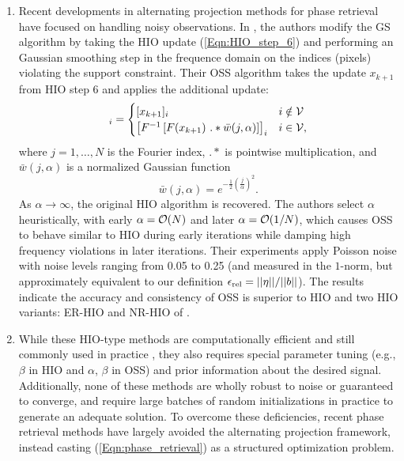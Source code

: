 \begin{enumerate}
\item

Recent developments in alternating projection methods for phase retrieval have focused on handling noisy observations.  In \cite{rodriguez2013oversampling}, the authors modify the GS algorithm by taking the HIO update (\ref{Eqn:HIO_step_6}) and performing an Gaussian smoothing step in the frequence domain on the indices (pixels) violating the support constraint.  Their OSS algorithm takes the update $x_{k+1}$ from HIO step 6 and applies the additional update:
\begin{equation}
[x'_{k+1}]_i =
	\begin{cases}
		[x_{k+1}]_i		&	i \notin \caV		\\
		\left[ F^{ -1} \left[ F ( x_{k+1}) \ .* \bar{w}(j, \alpha) \right]  \right]_i	&	 i \in \caV,
	\end{cases}
\end{equation}
where $j = 1, \ldots, N$ is the Fourier index, $.*$ is pointwise multiplication, and $\bar{w}(j, \alpha)$ is a normalized Gaussian function
\[
\bar{w}(j, \alpha) = e^ {- \frac{1}{2} \left(\frac{j}{\alpha} \right)^2}.
\]
As $\alpha \rightarrow \infty$, the original HIO algorithm is recovered.  The authors select $\alpha$ heuristically, with early $\alpha = {\mathcal O}(N)$ and later $\alpha = {\mathcal O}(1/N)$, which causes OSS to behave similar to HIO during early iterations while damping high frequency violations in later iterations.  Their experiments \cite[Section 3]{rodriguez2013oversampling} apply Poisson noise with noise levels ranging from 0.05 to 0.25 (and measured in the $1$-norm, but approximately equivalent to our definition $\epsilon_\textnormal{rel} = ||\eta|| / ||b||$).  The results indicate the accuracy and consistency of OSS is superior to HIO and two HIO variants: ER-HIO and NR-HIO of \cite{martin2012noise}.  





\item

While these HIO-type methods are computationally efficient and still commonly used in practice \cite{DBLP:journals/corr/JaganathanEH15a}, they also requires special parameter tuning (e.g., $\beta$ in HIO and $\alpha$, $\beta$ in OSS) and prior information about the desired signal.  Additionally, none of these methods are wholly robust to noise or guaranteed to converge, and require large batches of random initializations in practice to generate an adequate solution.  To overcome these deficiencies, recent phase retrieval methods have largely avoided the alternating projection framework, instead casting (\ref{Eqn:phase_retrieval}) as a structured optimization problem.



\end{enumerate}


